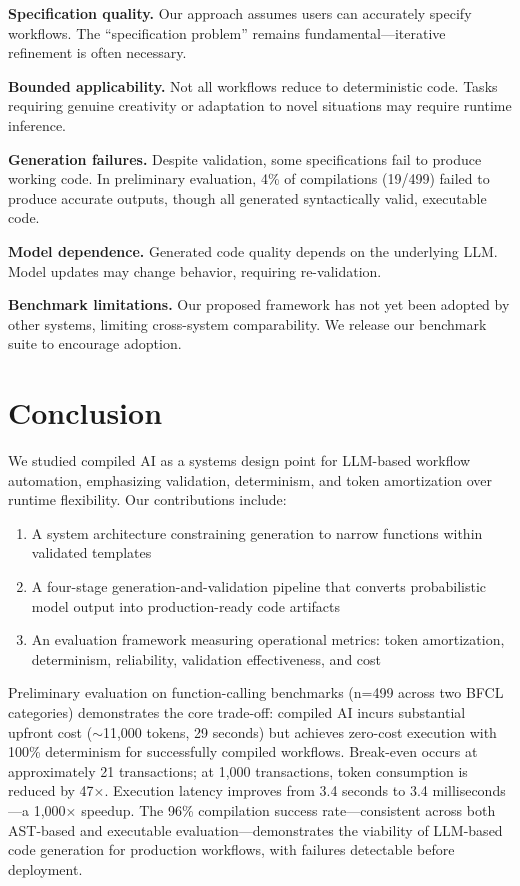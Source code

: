 \documentclass[11pt]{article}
\begin{document}
\textbf{Specification quality.} Our approach assumes users can accurately specify workflows. The ``specification problem'' remains fundamental—iterative refinement is often necessary.

\textbf{Bounded applicability.} Not all workflows reduce to deterministic code. Tasks requiring genuine creativity or adaptation to novel situations may require runtime inference.

\textbf{Generation failures.} Despite validation, some specifications fail to produce working code. In preliminary evaluation, 4\% of compilations (19/499) failed to produce accurate outputs, though all generated syntactically valid, executable code.

\textbf{Model dependence.} Generated code quality depends on the underlying LLM. Model updates may change behavior, requiring re-validation.

\textbf{Benchmark limitations.} Our proposed framework has not yet been adopted by other systems, limiting cross-system comparability. We release our benchmark suite to encourage adoption.

\section{Conclusion}
\label{sec:conclusion}

We studied compiled AI as a systems design point for LLM-based workflow automation, emphasizing validation, determinism, and token amortization over runtime flexibility. Our contributions include:

\begin{enumerate}
    \item A system architecture constraining generation to narrow functions within validated templates
    \item A four-stage generation-and-validation pipeline that converts probabilistic model output into production-ready code artifacts
    \item An evaluation framework measuring operational metrics: token amortization, determinism, reliability, validation effectiveness, and cost
\end{enumerate}

Preliminary evaluation on function-calling benchmarks (n=499 across two BFCL categories) demonstrates the core trade-off: compiled AI incurs substantial upfront cost ($\sim$11,000 tokens, 29 seconds) but achieves zero-cost execution with 100\% determinism for successfully compiled workflows. Break-even occurs at approximately 21 transactions; at 1,000 transactions, token consumption is reduced by 47$\times$. Execution latency improves from 3.4 seconds to 3.4 milliseconds—a 1,000$\times$ speedup. The 96\% compilation success rate—consistent across both AST-based and executable evaluation—demonstrates the viability of LLM-based code generation for production workflows, with failures detectable before deployment.
\end{document}
